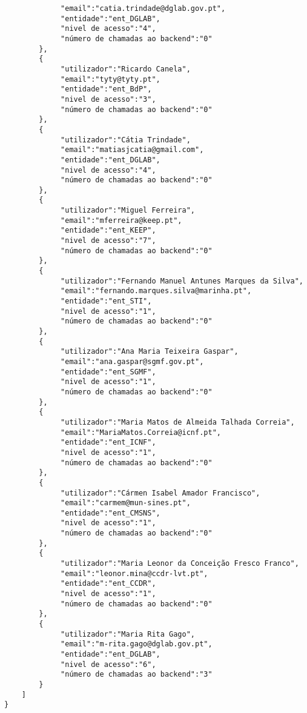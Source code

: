 \documentclass[11pt,a4paper]{report}%
\begin{document}
\begin{verbatim}
             "email":"catia.trindade@dglab.gov.pt",
             "entidade":"ent_DGLAB",
             "nivel de acesso":"4",
             "número de chamadas ao backend":"0"
        },
        {
             "utilizador":"Ricardo Canela",
             "email":"tyty@tyty.pt",
             "entidade":"ent_BdP",
             "nivel de acesso":"3",
             "número de chamadas ao backend":"0"
        },
        {
             "utilizador":"Cátia Trindade",
             "email":"matiasjcatia@gmail.com",
             "entidade":"ent_DGLAB",
             "nivel de acesso":"4",
             "número de chamadas ao backend":"0"
        },
        {
             "utilizador":"Miguel Ferreira",
             "email":"mferreira@keep.pt",
             "entidade":"ent_KEEP",
             "nivel de acesso":"7",
             "número de chamadas ao backend":"0"
        },
        {
             "utilizador":"Fernando Manuel Antunes Marques da Silva",
             "email":"fernando.marques.silva@marinha.pt",
             "entidade":"ent_STI",
             "nivel de acesso":"1",
             "número de chamadas ao backend":"0"
        },
        {
             "utilizador":"Ana Maria Teixeira Gaspar",
             "email":"ana.gaspar@sgmf.gov.pt",
             "entidade":"ent_SGMF",
             "nivel de acesso":"1",
             "número de chamadas ao backend":"0"
        },
        {
             "utilizador":"Maria Matos de Almeida Talhada Correia",
             "email":"MariaMatos.Correia@icnf.pt",
             "entidade":"ent_ICNF",
             "nivel de acesso":"1",
             "número de chamadas ao backend":"0"
        },
        {
             "utilizador":"Cármen Isabel Amador Francisco",
             "email":"carmem@mun-sines.pt",
             "entidade":"ent_CMSNS",
             "nivel de acesso":"1",
             "número de chamadas ao backend":"0"
        },
        {
             "utilizador":"Maria Leonor da Conceição Fresco Franco",
             "email":"leonor.mina@ccdr-lvt.pt",
             "entidade":"ent_CCDR",
             "nivel de acesso":"1",
             "número de chamadas ao backend":"0"
        },
        {
             "utilizador":"Maria Rita Gago",
             "email":"m-rita.gago@dglab.gov.pt",
             "entidade":"ent_DGLAB",
             "nivel de acesso":"6",
             "número de chamadas ao backend":"3"
        }
    ]
}
\end{verbatim}






\end{document}

